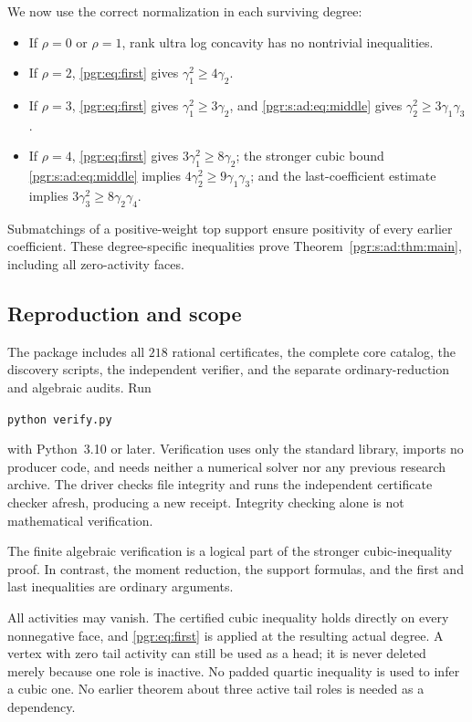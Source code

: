 \documentclass[11pt]{article}
\numberwithin{equation}{section}
\theoremstyle{definition}\newtheorem{definition}[theorem]{Definition}\newtheorem{remark}[theorem]{Remark}
\begin{document}
We now use the correct normalization in each surviving degree:
\begin{itemize}
\item If $\rho=0$ or $\rho=1$, rank ultra log concavity has no nontrivial inequalities.
\item If $\rho=2$, \eqref{pgr:eq:first} gives $\gamma_1^2\ge4\gamma_2$.
\item If $\rho=3$, \eqref{pgr:eq:first} gives $\gamma_1^2\ge3\gamma_2$, and \eqref{pgr:s:ad:eq:middle} gives $\gamma_2^2\ge3\gamma_1\gamma_3$.
\item If $\rho=4$, \eqref{pgr:eq:first} gives $3\gamma_1^2\ge8\gamma_2$; the stronger cubic bound \eqref{pgr:s:ad:eq:middle} implies $4\gamma_2^2\ge9\gamma_1\gamma_3$; and the last-coefficient estimate implies $3\gamma_3^2\ge8\gamma_2\gamma_4$.
\end{itemize}
Submatchings of a positive-weight top support ensure positivity of every earlier coefficient. These degree-specific inequalities prove Theorem~\ref{pgr:s:ad:thm:main}, including all zero-activity faces.

\subsection{Reproduction and scope}
The package includes all $218$ rational certificates, the complete core catalog, the discovery scripts, the independent verifier, and the separate ordinary-reduction and algebraic audits. Run
\begin{center}\texttt{python verify.py}\end{center}
with Python~3.10 or later. Verification uses only the standard library, imports no producer code, and needs neither a numerical solver nor any previous research archive. The driver checks file integrity and runs the independent certificate checker afresh, producing a new receipt. Integrity checking alone is not mathematical verification.

The finite algebraic verification is a logical part of the stronger cubic-inequality proof. In contrast, the moment reduction, the support formulas, and the first and last inequalities are ordinary arguments.

All activities may vanish. The certified cubic inequality holds directly on every nonnegative face, and \eqref{pgr:eq:first} is applied at the resulting actual degree. A vertex with zero tail activity can still be used as a head; it is never deleted merely because one role is inactive. No padded quartic inequality is used to infer a cubic one. No earlier theorem about three active tail roles is needed as a dependency.
\end{document}
